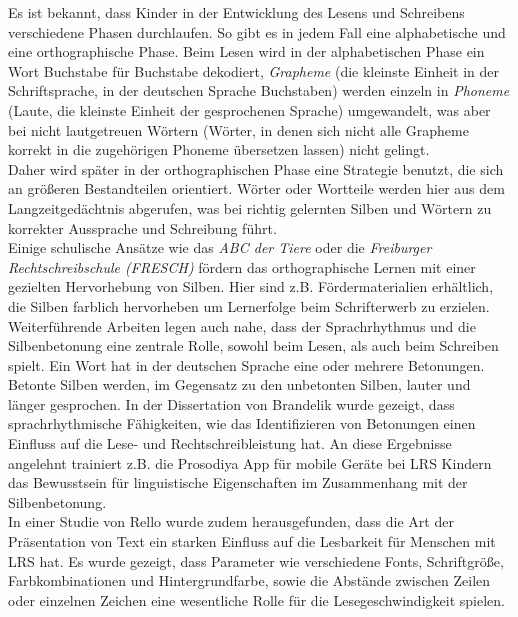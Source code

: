 Es ist bekannt, dass Kinder in der Entwicklung des Lesens und Schreibens verschiedene Phasen durchlaufen\cite{Steinbrink2014}. So gibt es in jedem Fall eine alphabetische und eine orthographische Phase. Beim Lesen wird in der alphabetischen Phase ein Wort Buchstabe für Buchstabe dekodiert, \textit{Grapheme} (die kleinste Einheit in der Schriftsprache, in der deutschen Sprache Buchstaben) werden einzeln in \textit{Phoneme} (Laute, die kleinste Einheit der gesprochenen Sprache) umgewandelt, was aber bei nicht lautgetreuen Wörtern (Wörter, in denen sich nicht alle Grapheme korrekt in die zugehörigen Phoneme übersetzen lassen) nicht gelingt.\\
Daher wird später in der orthographischen Phase eine Strategie benutzt, die sich an größeren Bestandteilen orientiert. Wörter oder Wortteile werden hier aus dem Langzeitgedächtnis abgerufen, was bei richtig gelernten Silben und Wörtern zu korrekter Aussprache und Schreibung führt.\\
Einige schulische Ansätze wie das \textit{ABC der Tiere}\cite{mildenberger2013} oder die \textit{Freiburger Rechtschreibschule (FRESCH)}\cite{Fresch2016} fördern das orthographische Lernen mit einer gezielten Hervorhebung von Silben. Hier sind z.B. Fördermaterialien erhältlich, die Silben farblich hervorheben um Lernerfolge beim Schrifterwerb zu erzielen.\\

Weiterführende Arbeiten legen auch nahe, dass der Sprachrhythmus und die Silbenbetonung eine zentrale Rolle, sowohl beim Lesen, als auch beim Schreiben spielt. Ein Wort hat in der deutschen Sprache eine oder mehrere Betonungen. Betonte Silben werden, im Gegensatz zu den unbetonten Silben, lauter und länger gesprochen. In der Dissertation von Brandelik\cite{Brandelik2014} wurde gezeigt, dass sprachrhythmische Fähigkeiten, wie das Identifizieren von Betonungen einen Einfluss auf die Lese- und Rechtschreibleistung hat. An diese Ergebnisse angelehnt trainiert z.B. die Prosodiya App\cite{Holz2017} für mobile Geräte bei LRS Kindern das Bewusstsein für linguistische Eigenschaften im Zusammenhang mit der Silbenbetonung.\\
In einer Studie von Rello\cite{Rello:2017:PMR:3057333.3057414} wurde zudem herausgefunden, dass die Art der Präsentation von Text ein starken Einfluss auf die Lesbarkeit für Menschen mit LRS hat. Es wurde gezeigt, dass Parameter wie verschiedene Fonts, Schriftgröße, Farbkombinationen und Hintergrundfarbe, sowie die Abstände zwischen Zeilen oder einzelnen Zeichen eine wesentliche Rolle für die Lesegeschwindigkeit spielen.

